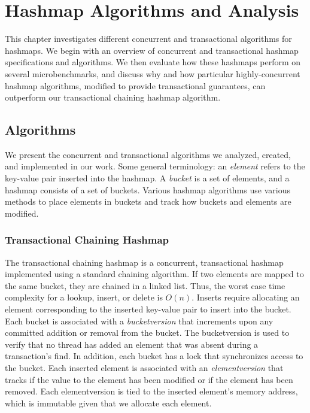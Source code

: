 \chapter{Hashmap Algorithms and Analysis}
\label{hashmap}

This chapter investigates different concurrent and transactional algorithms for hashmaps. We begin with an overview of concurrent and transactional hashmap specifications and algorithms. We then evaluate how these hashmaps perform on several microbenchmarks, and discuss why and how particular highly-concurrent hashmap algorithms, modified to provide transactional guarantees, can outperform our transactional chaining hashmap algorithm.

\section{Algorithms}

We present the concurrent and transactional algorithms we analyzed, created, and implemented in our work. Some general terminology: an \emph{element} refers to the key-value pair inserted into the hashmap. A \emph{bucket} is a set of elements, and a hashmap consists of a set of buckets. Various hashmap algorithms use various methods to place elements in buckets and track how buckets and elements are modified.

\subsection{Transactional Chaining Hashmap}
The transactional chaining hashmap is a concurrent, transactional hashmap implemented using a standard chaining algorithm. If two elements are mapped to the same bucket, they are chained in a linked list. Thus, the worst case time complexity for a lookup, insert, or delete is $O(n)$. Inserts require allocating an element corresponding to the inserted key-value pair to insert into the bucket. Each bucket is associated with a \emph{bucketversion} that increments upon any committed addition or removal from the bucket. The bucketversion is used to verify that no thread has added an element that was absent during a transaction's find. In addition, each bucket has a lock that synchronizes access to the bucket. Each inserted element is associated with an \emph{elementversion} that tracks if the value to the element has been modified or if the element has been removed. Each elementversion is tied to the inserted element's memory address, which is immutable given that we allocate each element.


